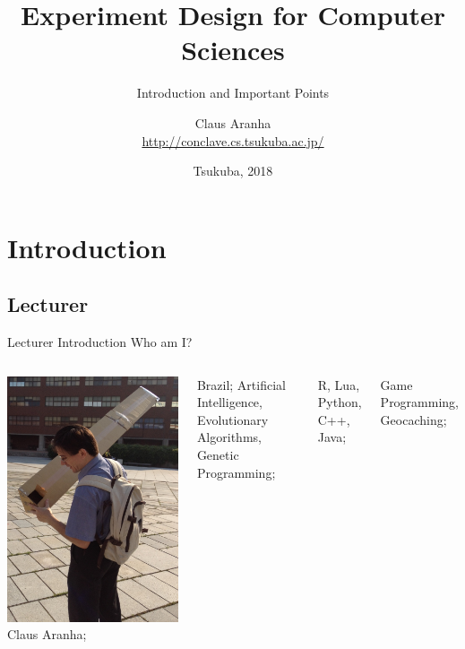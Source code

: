 \documentclass[t]{beamer}
\title[]{Experiment Design for Computer Sciences}
\subtitle[]{Introduction and Important Points}
\author[]{Claus Aranha\\{\footnotesize \url{http://conclave.cs.tsukuba.ac.jp/}}}
\institute{Computer Science Department}
\date{\scriptsize Tsukuba, 2018}
\begin{document}
\section{Introduction}
\subsection{Lecturer}
\begin{frame}
  \titlepage
\end{frame}


\begin{ftst}
{Lecturer Introduction}
{Who am I?}
\begin{columns}[T]
  \includegraphics[width=1\textwidth]{../../../figs/pinhole}
  \bitems {} Claus Aranha;
  \item {} Brazil; \spitem {}
    Artificial Intelligence, Evolutionary Algorithms, Genetic
    Programming;
  \item {} R, Lua, Python, C++, Java;
  \item {} Game Programming, Geocaching;

  \eitem
\end{columns}
\end{ftst}
\end{document}
